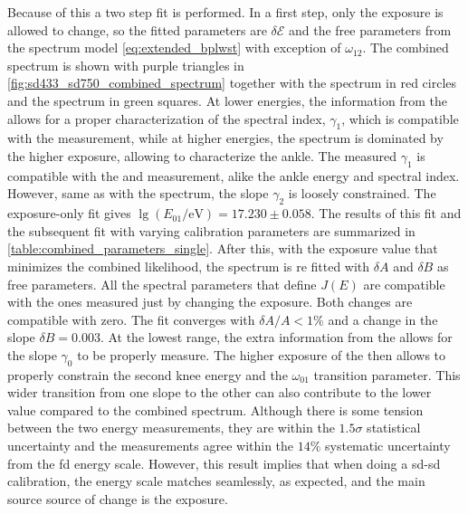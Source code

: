 \documentclass[main.tex]{subfiles}
\begin{document}
Because of this a two step fit is performed.
In a first step, only the exposure is allowed to change, so the fitted parameters are $\delta\mathcal{E}$ and the free parameters from the spectrum model \cref{eq:extended_bplwst} with exception of $\omega_{12}$.
The combined spectrum is shown with purple triangles in \cref{fig:sd433_sd750_combined_spectrum} together with the  spectrum in red circles and the  spectrum in green squares.
At lower energies, the information from the  allows for a proper characterization of the spectral index, $\gamma_1$, which is compatible with the  measurement, while at higher energies, the spectrum is dominated by the higher  exposure, allowing to characterize the ankle. 
The measured $\gamma_1$ is compatible with the  and  measurement, alike the ankle energy and spectral index.
However, same as with the  spectrum, the slope $\gamma_2$ is loosely constrained.
The exposure-only fit gives $\lg(E_{01}/\mathrm{eV})=17.230\pm0.058$.
The results of this fit and the subsequent fit with varying calibration parameters are summarized in \cref{table:combined_parameters_single}.
After this, with the exposure value that minimizes the combined likelihood, the spectrum is re fitted with $\delta A$ and $\delta B$ as free parameters.
All the spectral parameters that define $J(E)$ are compatible with the ones measured just by changing the exposure.
Both changes are compatible with zero.
The fit converges with $\delta A/A<1\%$ and a change in the slope $\delta B=0.003$.
At the lowest range, the extra information from the  allows for the slope $\gamma_0$ to be properly measure.
The higher exposure of the  then allows to properly constrain the second knee energy and the $\omega_01$ transition parameter.
This wider transition from one slope to the other can also contribute to the lower  value compared to the combined spectrum.
Although there is some tension between the two energy measurements, they are within the $1.5\sigma$ statistical uncertainty and the measurements agree within the $14\%$ systematic uncertainty from the \gls{fd} energy scale.
However, this result implies that when doing a \gls{sd}-\gls{sd} calibration, the energy scale matches seamlessly, as expected, and the main source source of change is the  exposure.
\end{document}
